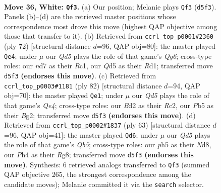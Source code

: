 \documentclass[11pt]{article}
\begin{document}
\clearpage

\begin{figure}[p]\centering
\begin{subfigure}{0.46\textwidth}\centering
\resizebox{\linewidth}{!}{%
\newchessgame
\chessboard[
  setfen={r2q1rk1/3n1p2/3p4/1PpQb2p/p5nP/P5P1/R1NB4/1N3RK1 w - - 2 36},
  showmover=false,
  pgfstyle=straightmove, color=movearrow, markmove={d5-f3}
]}
\caption{}
\end{subfigure}\hfill
\begin{subfigure}{0.46\textwidth}\centering
\resizebox{\linewidth}{!}{%
\newchessgame
\chessboard[
  setfen={2rb2k1/1pr1q1p1/4p1Qp/1P1n4/p1N2P2/P6P/1B4PK/2RR4 w - - 13 37},
  showmover=false,
  pgfstyle=straightmove, color=movearrow, markmove={g6-e4}
]}
\caption{}
\end{subfigure}
\\[4pt]
\begin{subfigure}{0.46\textwidth}\centering
\resizebox{\linewidth}{!}{%
\newchessgame
\chessboard[
  setfen={6k1/2r1qr1p/2pbp1pP/pp1n4/4Q1N1/1P4P1/2R2PB1/3R2K1 w - - 0 42},
  showmover=false,
  pgfstyle=straightmove, color=movearrow, markmove={e4-e1}
]}
\caption{}
\end{subfigure}\hfill
\begin{subfigure}{0.46\textwidth}\centering
\resizebox{\linewidth}{!}{%
\newchessgame
\chessboard[
  setfen={3n2r1/1kp2r1p/p3b3/3p4/Pq1Pp3/R3Q1N1/1P2B1PP/3R3K b - - 7 32},
  showmover=false,
  pgfstyle=straightmove, color=movearrow, markmove={b4-d6}
]}
\caption{}
\end{subfigure}
\caption{\textbf{Move 36, White: \texttt{Qf3}.} (a) Our position; Melanie plays \texttt{Qf3} (\texttt{d5f3}). Panels (b)--(d) are the retrieved master positions whose correspondence most drove this move (highest QAP objective among those that transfer to it). (b) Retrieved from \texttt{ccrl\_top\_p0001\#2360} (ply 72) [structural distance $d$=96, QAP obj=80]: the master played \texttt{Qe4}; under $\mu$ our \emph{Qd5} plays the role of that game's \emph{Qg6}; cross-type roles: our \emph{n}d7 as their \emph{R}c1, our \emph{Q}d5 as their \emph{R}d1; transferred move \texttt{d5f3} \textbf{(endorses this move)}. (c) Retrieved from \texttt{ccrl\_top\_p0003\#1181} (ply 82) [structural distance $d$=94, QAP obj=70]: the master played \texttt{Qe1}; under $\mu$ our \emph{Qd5} plays the role of that game's \emph{Qe4}; cross-type roles: our \emph{B}d2 as their \emph{R}c2, our \emph{P}b5 as their \emph{B}g2; transferred move \texttt{d5f3} \textbf{(endorses this move)}. (d) Retrieved from \texttt{ccrl\_top\_p0002\#1837} (ply 63) [structural distance $d$=96, QAP obj=41]: the master played \texttt{Qd6}; under $\mu$ our \emph{Qd5} plays the role of that game's \emph{Qb5}; cross-type roles: our \emph{p}h5 as their \emph{N}d8, our \emph{P}h4 as their \emph{R}g8; transferred move \texttt{d5f3} \textbf{(endorses this move)}. Synthesis: 6 retrieved analogs transferred to \texttt{Qf3} (summed QAP objective 265, the strongest correspondence among the candidate moves); Melanie committed it via the \texttt{search} selector.}
\label{fig:thought-m70}
\end{figure}
\end{document}
